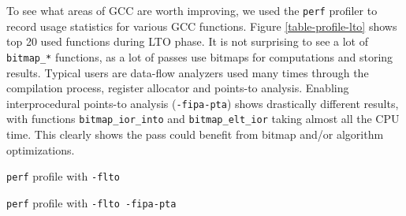 To see what areas of GCC are worth improving, we used the {\tt perf} profiler to record usage
statistics for various GCC functions. Figure \ref{table-profile-lto} shows top 20 used
functions during LTO phase. It is not surprising to see a lot of {\tt bitmap\_*}
functions, as a lot of passes use bitmaps for computations and storing results.
Typical users are data-flow analyzers \cite{muchnick1997advanced} used many times through the
compilation process, register allocator and points-to analysis. Enabling
interprocedural points-to analysis ({\tt -fipa-pta}) shows drastically different
results, with functions {\tt bitmap\_ior\_into} and {\tt bitmap\_elt\_ior}
taking almost all the CPU time. This clearly shows the pass could benefit from
bitmap and/or algorithm optimizations.

\begin{table}
\centering
\noindent
\caption{{\tt perf} profile with {\tt -flto}}
\label{table-profile-lto}
\end{table}

\begin{table}
\centering
\noindent
\caption{{\tt perf} profile with {\tt -flto -fipa-pta}}
\label{table-profile-lto-pta}
\end{table}



